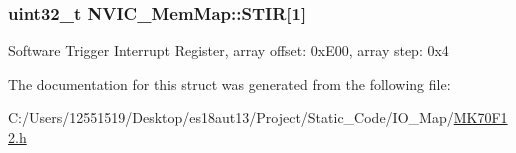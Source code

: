 \subsubsection[{S\+T\+I\+R}]{\setlength{\rightskip}{0pt plus 5cm}uint32\+\_\+t N\+V\+I\+C\+\_\+\+Mem\+Map\+::\+S\+T\+I\+R\mbox{[}1\mbox{]}}\label{struct_n_v_i_c___mem_map_a417658a729224de65052153f5c2cc419}
Software Trigger Interrupt Register, array offset\+: 0x\+E00, array step\+: 0x4 

The documentation for this struct was generated from the following file\+:\begin{DoxyCompactItemize}
\item 
C\+:/\+Users/12551519/\+Desktop/es18aut13/\+Project/\+Static\+\_\+\+Code/\+I\+O\+\_\+\+Map/\hyperlink{_m_k70_f12_8h}{M\+K70\+F12.\+h}\end{DoxyCompactItemize}
